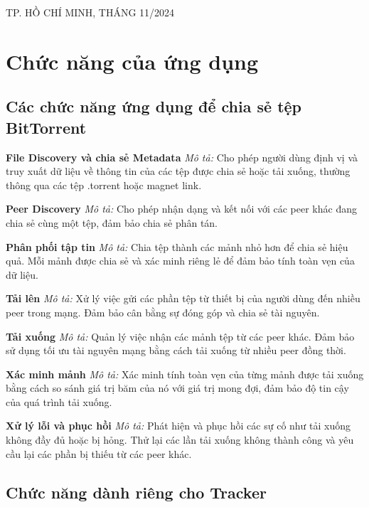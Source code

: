 \documentclass[a4paper]{article}
\begin{document}
\begin{titlepage}
\begin{center}
{\footnotesize TP. HỒ CHÍ MINH, THÁNG 11/2024}
\end{center}
\end{titlepage}

\newpage
\tableofcontents
\newpage

\section{Chức năng của ứng dụng}
\subsection{Các chức năng ứng dụng để chia sẻ tệp BitTorrent}
    \textbf{File Discovery và chia sẻ Metadata}  
    \textit{Mô tả:} Cho phép người dùng định vị và truy xuất dữ liệu về thông tin của các tệp được chia sẻ hoặc tải xuống, thường thông qua các tệp .torrent hoặc magnet link.  

    \textbf{Peer Discovery}  
    \textit{Mô tả:} Cho phép nhận dạng và kết nối với các peer khác đang chia sẻ cùng một tệp, đảm bảo chia sẻ phân tán.  


    \textbf{Phân phối tập tin}  
    \textit{Mô tả:} Chia tệp thành các mảnh nhỏ hơn để chia sẻ hiệu quả. Mỗi mảnh được chia sẻ và xác minh riêng lẻ để đảm bảo tính toàn vẹn của dữ liệu.  
    

    \textbf{Tải lên}  
    \textit{Mô tả:} Xử lý việc gửi các phần tệp từ thiết bị của người dùng đến nhiều peer trong mạng. Đảm bảo cân bằng sự đóng góp và chia sẻ tài nguyên.  
    

    \textbf{Tải xuống}  
    \textit{Mô tả:} Quản lý việc nhận các mảnh tệp từ các peer khác. Đảm bảo sử dụng tối ưu tài nguyên mạng bằng cách tải xuống từ nhiều peer đồng thời.  
    

    \textbf{Xác minh mảnh}  
    \textit{Mô tả:} Xác minh tính toàn vẹn của từng mảnh được tải xuống bằng cách so sánh giá trị băm của nó với giá trị mong đợi, đảm bảo độ tin cậy của quá trình tải xuống.  
    

    \textbf{Xử lý lỗi và phục hồi}  
    \textit{Mô tả:} Phát hiện và phục hồi các sự cố như tải xuống không đầy đủ hoặc bị hỏng. Thử lại các lần tải xuống không thành công và yêu cầu lại các phần bị thiếu từ các peer khác.  
    
\subsection{Chức năng dành riêng cho Tracker}
\end{document}
